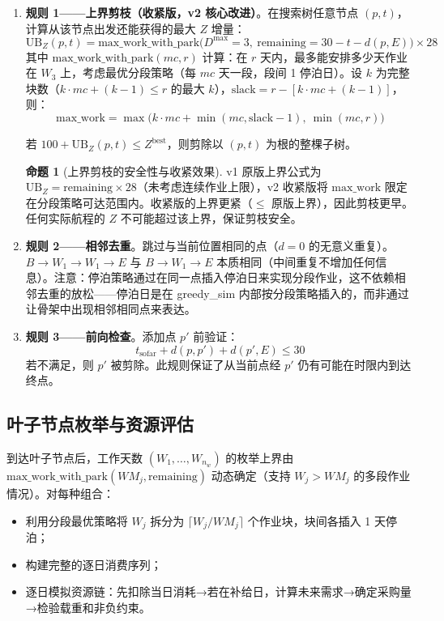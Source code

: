 \documentclass[12pt,a4paper]{ctexart}
\theoremstyle{definition}
\newtheorem{proposition}{命题}[section]
\begin{document}
\begin{enumerate}
  \item \textbf{规则 1——上界剪枝（收紧版，v2 核心改进）}。在搜索树任意节点 $(p,t)$，计算从该节点出发还能获得的最大 $Z$ 增量：
  \begin{equation}
    \text{UB}_Z(p,t) = \text{max\_work\_with\_park}\big(D^{\max}=3,\ \text{remaining}=30-t-d(p,E)\big)\times 28
  \end{equation}
  其中 $\text{max\_work\_with\_park}(mc,r)$ 计算：在 $r$ 天内，最多能安排多少天作业在 $W_3$ 上，考虑最优分段策略（每 $mc$ 天一段，段间 1 停泊日）。设 $k$ 为完整块数（$k\cdot mc+(k-1)\le r$ 的最大 $k$），$\text{slack}=r-[k\cdot mc+(k-1)]$，则：
  \begin{equation}
    \text{max\_work} = \max\big(k\cdot mc+\min(mc,\text{slack}-1),\ \min(mc,r)\big)
  \end{equation}

  若 $100+\text{UB}_Z(p,t)\le Z^{\text{best}}$，则剪除以 $(p,t)$ 为根的整棵子树。

  \begin{proposition}[上界剪枝的安全性与收紧效果]\label{prop:ub-safe}
    v1 原版上界公式为 $\text{UB}_Z = \text{remaining}\times 28$（未考虑连续作业上限），v2 收紧版将 $\text{max\_work}$ 限定在分段策略可达范围内。收紧版的上界更紧（$\le$ 原版上界），因此剪枝更早。任何实际航程的 $Z$ 不可能超过该上界，保证剪枝安全。
  \end{proposition}

  \item \textbf{规则 2——相邻去重}。跳过与当前位置相同的点（$d=0$ 的无意义重复）。$B\to W_1\to W_1\to E$ 与 $B\to W_1\to E$ 本质相同（中间重复不增加任何信息）。注意：停泊策略通过在同一点插入停泊日来实现分段作业，这不依赖相邻去重的放松——停泊日是在 greedy\_sim 内部按分段策略插入的，而非通过让骨架中出现相邻相同点来表达。

  \item \textbf{规则 3——前向检查}。添加点 $p'$ 前验证：
  \begin{equation}
    t_{\text{sofar}} + d(p,p') + d(p',E) \le 30
  \end{equation}
  若不满足，则 $p'$ 被剪除。此规则保证了从当前点经 $p'$ 仍有可能在时限内到达终点。
\end{enumerate}

\subsection{叶子节点枚举与资源评估}

到达叶子节点后，工作天数 $(W_1,\dots,W_{n_w})$ 的枚举上界由 $\text{max\_work\_with\_park}(WM_j,\text{remaining})$ 动态确定（支持 $W_j>WM_j$ 的多段作业情况）。对每种组合：
\begin{itemize}
  \item 利用分段最优策略将 $W_j$ 拆分为 $\lceil W_j/WM_j\rceil$ 个作业块，块间各插入 1 天停泊；
  \item 构建完整的逐日消费序列；
  \item 逐日模拟资源链：先扣除当日消耗→若在补给日，计算未来需求→确定采购量→检验载重和非负约束。
\end{itemize}
\end{document}
